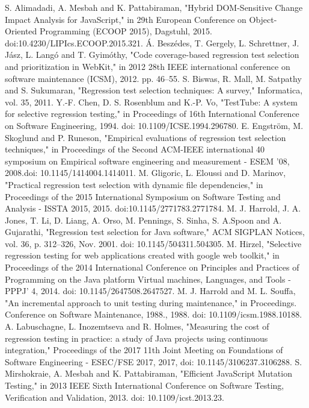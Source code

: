 \documentclass[10pt, conference]{IEEEtran}
\begin{document}
\begin{thebibliography}{00}
 S. Alimadadi, A. Mesbah and K. Pattabiraman, "Hybrid DOM-Sensitive Change Impact Analysis for JavaScript," in 29th European Conference on Object-Oriented Programming (ECOOP 2015), Dagstuhl, 2015. doi:10.4230/LIPIcs.ECOOP.2015.321.
 Á. Beszédes, T. Gergely, L. Schrettner, J. Jász, L. Langó and T. Gyimóthy, "Code coverage-based regression test selection and prioritization in WebKit," in 2012 28th IEEE international conference on software maintenance (ICSM), 2012. pp. 46–55.
 S. Biswas, R. Mall, M. Satpathy and S. Sukumaran, "Regression test selection techniques: A survey," Informatica, vol. 35, 2011. 
 Y.-F. Chen, D. S. Rosenblum and K.-P. Vo, "TestTube: A system for selective regression testing," in Proceedings of 16th International Conference on Software Engineering, 1994. doi: 10.1109/ICSE.1994.296780.
 E. Engström, M. Skoglund and P. Runeson, "Empirical evaluations of regression test selection techniques," in Proceedings of the Second ACM-IEEE international 40 symposium on Empirical software engineering and measurement - ESEM '08, 2008.doi: 10.1145/1414004.1414011.
 M. Gligoric, L. Eloussi and D. Marinov, "Practical regression test selection with dynamic file dependencies," in Proceedings of the 2015 International Symposium on Software Testing and Analysis - ISSTA 2015, 2015. doi:10.1145/2771783.2771784.
 M. J. Harrold, J. A. Jones, T. Li, D. Liang, A. Orso, M. Pennings, S. Sinha, S. A.Spoon and A. Gujarathi, "Regression test selection for Java software," ACM SIGPLAN Notices, vol. 36, p. 312–326, Nov. 2001. doi: 10.1145/504311.504305.
 M. Hirzel, "Selective regression testing for web applications created with google web toolkit," in Proceedings of the 2014 International Conference on Principles and Practices of Programming on the Java platform Virtual machines, Languages, and Tools - PPPJ' 4, 2014. doi: 10.1145/2647508.2647527.
 M. J. Harrold and M. L. Souffa, "An incremental approach to unit testing during maintenance," in Proceedings. Conference on Software Maintenance, 1988., 1988. doi: 10.1109/icsm.1988.10188.
 A. Labuschagne, L. Inozemtseva and R. Holmes, "Measuring the cost of regression testing in practice: a study of Java projects using continuous integration," Proceedings of the 2017 11th Joint Meeting on Foundations of Software Engineering - ESEC/FSE 2017, 2017, doi: 10.1145/3106237.3106288.
 S. Mirshokraie, A. Mesbah and K. Pattabiraman, "Efficient JavaScript Mutation Testing," in 2013 IEEE Sixth International Conference on Software Testing, Verification and Validation, 2013. doi: 10.1109/icst.2013.23.

\end{thebibliography}
\end{document}
